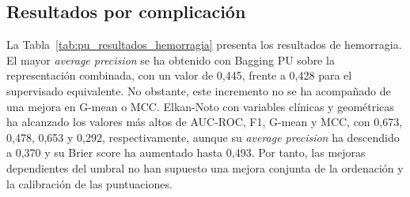 \subsection{Resultados por complicación}

La Tabla~\ref{tab:pu_resultados_hemorragia} presenta los resultados de hemorragia. El mayor \textit{average precision} se ha obtenido con Bagging PU sobre la representación combinada, con un valor de 0,445, frente a 0,428 para el supervisado equivalente. No obstante, este incremento no se ha acompañado de una mejora en G-mean o MCC. Elkan-Noto con variables clínicas y geométricas ha alcanzado los valores más altos de AUC-ROC, F1, G-mean y MCC, con 0,673, 0,478, 0,653 y 0,292, respectivamente, aunque su \textit{average precision} ha descendido a 0,370 y su Brier score ha aumentado hasta 0,493. Por tanto, las mejoras dependientes del umbral no han supuesto una mejora conjunta de la ordenación y la calibración de las puntuaciones.

